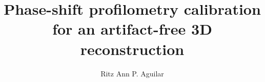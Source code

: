 \documentclass[]{nip} %
\title{Phase-shift profilometry calibration for an artifact-free 3D reconstruction} %
\author{Ritz Ann P. Aguilar} %
\begin{document}
\maketitle %
\makePrelim %








%


\end{document}
